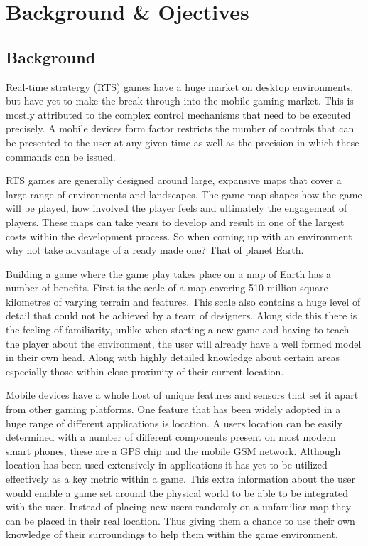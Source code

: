 \chapter{Background \& Ojectives}

\section{Background}
Real-time stratergy (RTS) games have a huge market on desktop environments, but have yet to make the break through into the mobile gaming market. This is mostly attributed to the complex control mechanisms that need to be executed precisely. A mobile devices form factor restricts the number of controls that can be presented to the user at any given time as well as the precision in which these commands can be issued.

RTS games are generally designed around large, expansive maps that cover a large range of environments and landscapes. The game map shapes how the game will be played, how involved the player feels and ultimately the engagement of players. These maps can take years to develop and result in one of the largest costs within the development process. So when coming up with an environment why not take advantage of a ready made one? That of planet Earth.

Building a game where the game play takes place on a map of Earth has a number of benefits. First is the scale of a map covering 510 million square kilometres of varying terrain and features. This scale also contains a huge level of detail that could not be achieved by a team of designers. Along side this there is the feeling of familiarity, unlike when starting a new game and having to teach the player about the environment, the user will already have a well formed model in their own head. Along with highly detailed knowledge about certain areas especially those within close proximity of their current location.

Mobile devices have a whole host of unique features and sensors that set it apart from other gaming platforms. One feature that has been widely adopted in a huge range of different applications is location. A users location can be easily determined with a number of different components present on most modern smart phones, these are a GPS chip and the mobile GSM network. Although location has been used extensively in applications it has yet to be utilized effectively as a key metric within a game. This extra information about the user would enable a game set around the physical world to be able to be integrated with the user. Instead of placing new users randomly on a unfamiliar map they can be placed in their real location. Thus giving them a chance to use their own knowledge of their surroundings to help them within the game environment.


